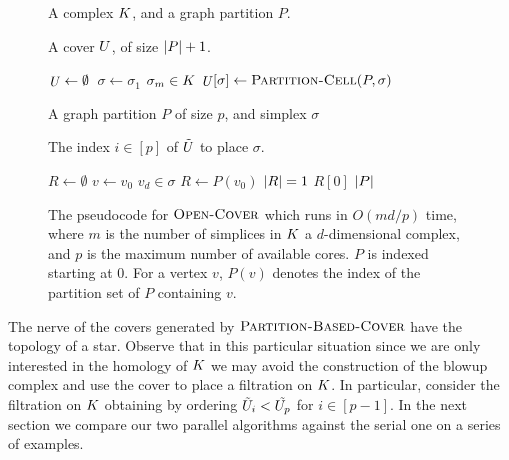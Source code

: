 \documentclass{jocg}
\begin{document}
\begin{figure}[h!]
\begin{multicols}{2}
{
\begin{description}
\addtolength{\itemsep}{-.65\baselineskip}
\item[\small\textbf{Input:}] \small A complex $K$, and a graph partition $P$.
\item[\small\textbf{Output:}] \small A cover $U$, of size $|P|+1$.
\end{description}
\vspace{-.6cm}
\begin{codebox}
 \li	$\id{\C} \gets \emptyset$
 \li  \Parfor\,$ \sigma \gets \sigma_1$ \To $\sigma_m \in K$
 \li 	   \Do  $\id{\C}[\sigma] \gets \proc{Partition-Cell}(P,\sigma)$
          \End
 \li \Return \id{\C}
  \End
\end{codebox}
}
{
\begin{description}
\addtolength{\itemsep}{-.65\baselineskip}
\item[\small \textbf{Input:}] \small A graph partition $P$ of size $p$, and simplex $\sigma$
\item[\small \textbf{Output:}] \small The index $i \in [p]$ of  $\tilde{U}$ to place $\sigma$.
\end{description}
\vspace{-.65cm}
\begin{codebox}
 \li	$R \gets \emptyset$
 \li  \For $v \gets v_0$ \To $v_d \in \sigma$
 \li 	   \Do $R \gets P(v_0)$
          \End
 \li	\If $|R| = 1$ \Return $R[0]$
 \li    \Else \Return $|P|$
\end{codebox}
}
\end{multicols}
\caption{The pseudocode for $\textnormal{\scshape Open-Cover}$ which runs in $O(md/p)$ time, where $m$ is the 
number of simplices in $K$ a $d$-dimensional complex, and $p$ is the 
maximum number of available cores. $P$ is indexed starting at 0. For a vertex $v$, $P(v)$ 
denotes the index of the partition set of $P$ containing $v$.
}
\label{alg:open-cov}
\end{figure}
The nerve of the covers generated by $\textnormal{\scshape Partition-Based-Cover}$ have the topology of a star. 
Observe that in this particular situation since we are only interested in the homology of $K$ we may avoid the 
construction of the blowup complex and use the cover to place a filtration on $K$. In particular, consider the filtration on $K$ obtaining by 
ordering $\tilde{U}_i < \tilde{U_p}$ for $i \in [p-1]$. In the next section we compare our two parallel algorithms against 
the serial one on a series of examples.
\vspace{-5mm} 
\end{document}
